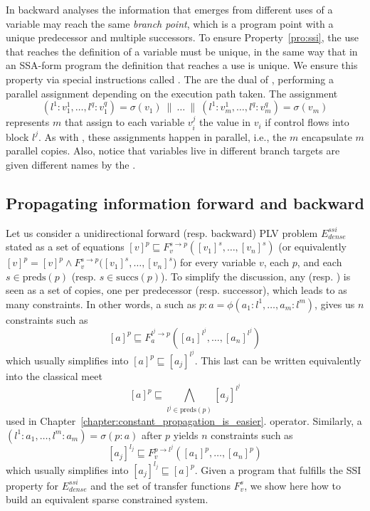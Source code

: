 {%
In backward analyses the information that emerges from different uses of a variable may reach the same {\em branch point}, which is a program point with a unique predecessor and multiple successors.
To ensure Property~\ref{pro:ssi}, the use that reaches the definition of a
variable must be unique, in the same way that in an SSA-form program the 
definition that reaches a use is unique.
We ensure this property via special instructions called \sigmafuns.
The \sigmafuns are the dual of \phifuns, performing a parallel assignment depending on the execution path taken.
The assignment \[(l^1:v_1^1, \ldots, l^q:v_1^q) = \sigma(v_1) \ \parallel\  \dots \ \parallel\  (l^1:v_m^1, \ldots, l^q:v_m^q) = \sigma(v_m)\] represents $m$ \sigmafuns that assign to each variable $v_i^j$ the value in $v_i$ if control flows into block $l^j$.
As with \phifuns, these assignments happen in parallel, i.e., the $m$ \sigmafuns encapsulate $m$ parallel copies.
Also, notice that variables live in different branch targets are given
different names by the \sigmafun.

\subsection{Propagating information forward and backward}
\label{sec:ssi:pereira:engine}

Let us consider a unidirectional forward (resp. backward) PLV problem 
$E^{\textit{ssi}}_{\textit{dense}}$ stated as a set of equations $[v]^p 
\sqsubseteq  F_v^{s\to p}([v_1]^s, \dots, [v_n]^s)$ (or equivalently $[v]^p 
= [v]^p \wedge    F_v^{s\to p}([v_1]^s, \dots, [v_n]^s$) for every variable 
$v$, each \progpoint $p$, and each $s \in \textrm{preds}(p)$ (resp. $s \in 
\textrm{succs}(p)$).  To simplify the discussion, any \phifun (resp. \sigmafun) 
is seen as a set of copies, one per predecessor (resp. successor), which leads 
to as many constraints.
In other words, a \phifun such as $p:a=\phi(a_1:l^1,\dots,a_m:l^m)$, gives us 
$n$ constraints such as
$$[a]^p \sqsubseteq  F_a^{l^j\to p}([a_1]^{l^j}, \dots, [a_n]^{l^j})$$
which usually simplifies into $[a]^p \sqsubseteq [a_j]^{l^j}$.
%
This last can be written equivalently into the classical meet
$$[a]^p \sqsubseteq \bigwedge_{l^j \in \textrm{preds}(p)} [a_j]^{l^j}$$
\ifconstantprop
used in Chapter~\ref{chapter:constant_propagation_is_easier}.
\else
operator.
\fi
Similarly, a \sigmafun $(l^1:a_1,\dots,l^m:a_m)=\sigma(p:a)$ after \progpoint 
$p$ yields $n$ constraints such as
$$[a_j]^{l_j} \sqsubseteq  F_v^{p\to l^j}([a_1]^p, \dots, [a_n]^p)$$
which usually simplifies into $[a_j]^{l_j} \sqsubseteq [a]^p$.
Given a program that fulfills the SSI property for $E^{\textit{ssi}}_{\textit{dense}}$ and the set of transfer functions $F_v^s$, we show here how to build an equivalent sparse constrained system.  

}
